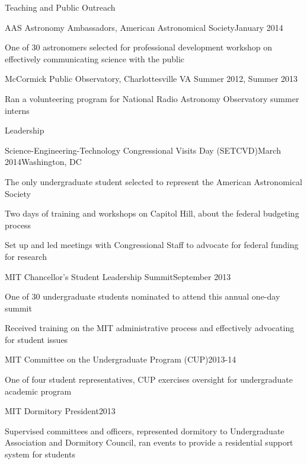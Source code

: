 \documentclass{resume} %
\begin{document}
\begin{rSection}{Teaching and Public Outreach}
  \begin{rSubsection}{AAS Astronomy Ambassadors, American Astronomical Society}{January 2014}{}{}
  \item One of 30 astronomers selected for professional development workshop on effectively communicating science with the public
  \end{rSubsection}

  \begin{rSubsection}{McCormick Public Observatory, Charlottesville VA}
    {Summer 2012, Summer 2013}{}{}
  \item Ran a volunteering program for National Radio Astronomy Observatory summer interns
  \end{rSubsection}

\end{rSection}

\begin{rSection}{Leadership}

  \begin{rSubsection}{Science-Engineering-Technology Congressional Visits Day (SETCVD)}{March 2014}{}{Washington, DC}
  \item The only undergraduate student selected to represent the American Astronomical Society
  \item Two days of training and workshops on Capitol Hill, about the federal budgeting process 
  \item Set up and led meetings with Congressional Staff to advocate for federal funding for research 
  \end{rSubsection}

\begin{rSubsection}{MIT Chancellor's Student Leadership Summit}{September 2013}{}{}
\item One of 30 undergraduate students nominated to attend this annual one-day summit
\item Received training on the MIT administrative process and effectively advocating for student issues 
\end{rSubsection}

\begin{rSubsection}{MIT Committee on the Undergraduate Program (CUP)}{2013-14}{}{}
\item One of four student representatives, CUP exercises oversight for undergraduate academic program
\end{rSubsection}

\begin{rSubsection}{MIT Dormitory President}{2013}{}{}
\item Supervised committees and officers, represented dormitory to Undergraduate Association and Dormitory Council, ran events to provide a residential support system for students
\end{rSubsection}

\end{rSection}
\end{document}
